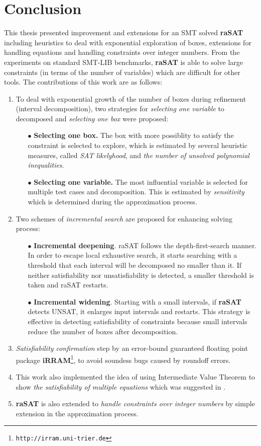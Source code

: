 \chapter{Conclusion}


This thesis presented improvement and extensions for an SMT solved {\bf raSAT} including heuristics to deal with exponential exploration of boxes, extensions for handling equations and handling constraints over integer numbers. From the experiments on standard SMT-LIB benchmarks, \textbf{raSAT} is able to solve large constraints (in terms of the number of variables) which are difficult for other tools.
The contributions of this work are as follows:
\begin{enumerate}
\item To deal with exponential growth of the number of boxes during refinement (interval decomposition), two strategies for \emph{selecting one variable} to decomposed and \emph{selecting one box} were proposed:
\begin{itemize}
\item[$\bullet$] \textbf{Selecting one box.} The box with more possiblity to satisfy the constraint is selected to explore, which is estimated by 
several heuristic measures, called {\em SAT likelyhood}, 
and \emph{the number of unsolved polynomial inequalities}.
\item[$\bullet$] \textbf{Selecting one variable.} The most influential variable is selected for multiple test cases and decomposition. 
This is estimated by {\em sensitivity} which is determined during the approximation process.
\end{itemize}
\item Two schemes of \emph{incremental search} are proposed for enhancing solving process: 
\begin{itemize} 
\item[$\bullet$] {\bf Incremental deepening}. 
raSAT follows the depth-first-search manner. In order to escape local exhaustive search, it starts searching with a threshold that each interval will be decomposed no smaller than it. 
If neither satisfiability nor unsatisfiability is detected, a smaller threshold is taken and raSAT restarts. 
\item[$\bullet$] {\bf Incremental widening}. 
Starting with a small intervals, if \textbf{raSAT} detects UNSAT, it enlarges input intervals and restarts. This strategy is effective in detecting satisfiability of constraints because small intervals reduce the number of boxes after decomposition.
\end{itemize}
\item \emph{Satisfiability confirmation} step by an error-bound guaranteed floating point package {\bf iRRAM}\footnote{%
\tt http://irram.uni-trier.de}, to avoid soundess bugs caused by roundoff errors.
\item This work also implemented the idea of using Intermediate Value Theorem to show \emph{the satisfiability of multiple equations} which was suggested in \cite{VanKhanh201227}.
\item \textbf{raSAT} is also extended to \emph{handle constraints over integer numbers} by simple extension in the approximation process.
\end{enumerate}

